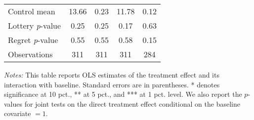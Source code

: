 \begin{table}[htbp]
{\begin{threeparttable}
\begin{tabular}{l*{4}{c}}
Control mean    &    13.66         &     0.23         &    11.78         &     0.12         \\
Lottery \emph{p}-value&     0.25         &     0.25         &     0.17         &     0.63         \\
Regret \emph{p}-value&     0.55         &     0.55         &     0.58         &     0.15         \\
Observations    &      311         &      311         &      311         &      284         \\
\bottomrule \end{tabular} \begin{tablenotes}[flushleft] \footnotesize \item \emph{Notes:} This table reports OLS estimates of the treatment effect and its interaction with baseline. Standard errors are in parentheses. * denotes significance at 10 pct., ** at 5 pct., and *** at 1 pct. level. We also report the \(p\)-values for joint tests on the direct treatment effect conditional on the baseline covariate $= 1$. \end{tablenotes} \end{threeparttable} } \end{table}

